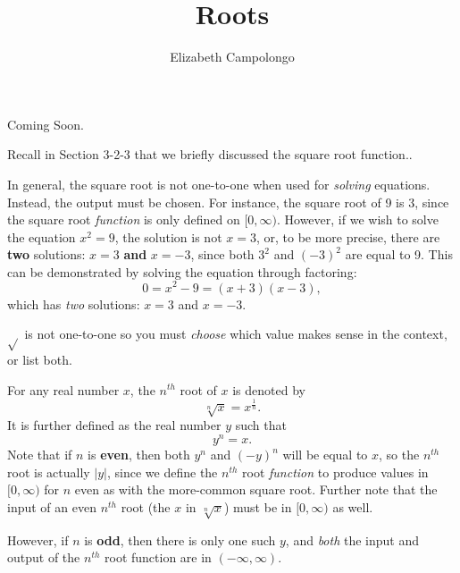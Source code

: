 \documentclass{ximera}
\author{Elizabeth Campolongo}
\title{Roots}
\begin{document}
\begin{abstract}
  
\end{abstract}
\maketitle

Coming Soon.

Recall in Section 3-2-3 that we briefly discussed the square root function..


In general, the square root is not one-to-one when used for {\em solving} equations. Instead, the output must be chosen. For instance, the square root of 9 is 3, since the square root {\em function} is only defined on $[0,\infty)$. However, if we wish to solve the equation $x^2=9$, the solution is not $x=3$, or, to be more precise, there are \textbf{two} solutions: $x=3$ \textbf{and} $x = -3$, since both $3^2$ and $(-3)^2$ are equal to 9. This can be demonstrated by solving the equation through factoring:
$$0=x^2-9 =(x+3)(x-3),$$
which has {\em two} solutions: $x=3$ and $x = -3$.

$\sqrt{}$ is not one-to-one so you must {\em choose} which value makes sense in the context, or list both.

\begin{definition}
For any real number $x$, the $n^{th}$ root of $x$ is denoted by 
$$\sqrt[n]{x} = x^{\frac{1}{n}}.$$
%
It is further defined as the real number $y$ such that 
$$y^n = x.$$
Note that if $n$ is \textbf{even}, then both $y^n$ and $(-y)^n$ will be equal to $x$, so the $n^{th}$ root is actually $|y|$, since we define the $n^{th}$ root {\em function} to produce values in $[0,\infty)$ for $n$ even as with the more-common square root. Further note that the input of an even $n^{th}$ root (the $x$ in $\sqrt[n]{x}$) must be in $[0,\infty)$ as well.

However, if $n$ is \textbf{odd}, then there is only one such $y$, and {\em both} the input and output of the $n^{th}$ root function are in $(-\infty,\infty)$.
\end{definition}
\end{document}
